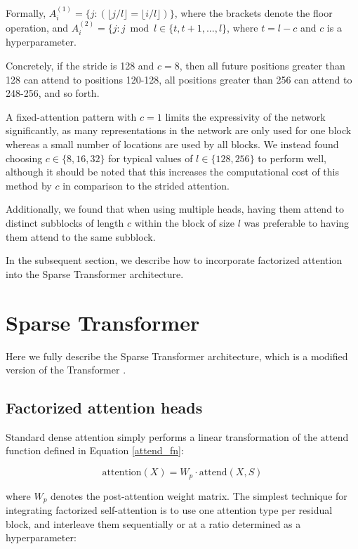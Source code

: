 \documentclass{article}
\begin{document}
Formally, $A_{i}^{(1)} = \{j : (\lfloor j / l \rfloor = \lfloor i / l \rfloor)\} $, where the brackets denote the floor operation, and $A_{i}^{(2)} = \{j : j \bmod l \in \{t, t + 1, ..., l \}$, where $t = l - c$ and $c$ is a hyperparameter. 

Concretely, if the stride is 128 and $c = 8$, then all future positions greater than 128 can attend to positions 120-128, all positions greater than 256 can attend to 248-256, and so forth.

A fixed-attention pattern with $c = 1$ limits the expressivity of the network significantly, as many representations in the network are only used for one block whereas a small number of locations are used by all blocks. We instead found choosing $c \in \{8, 16, 32\}$ for typical values of $l \in \{128, 256\}$ to perform well, although it should be noted that this increases the computational cost of this method by $c$ in comparison to the strided attention.

Additionally, we found that when using multiple heads, having them attend to distinct subblocks of length $c$ within the block of size $l$ was preferable to having them attend to the same subblock.

In the subsequent section, we describe how to incorporate factorized attention into the Sparse Transformer architecture.

\section{Sparse Transformer}
Here we fully describe the Sparse Transformer architecture, which is a modified version of the Transformer \cite{vaswani2017attention}.

\subsection{Factorized attention heads}
Standard dense attention simply performs a linear transformation of the $\mathrm{attend}$ function defined in Equation \ref{attend_fn}:

\begin{equation}\label{wpmat}
\mathrm{attention}(X) = W_p \cdot \mathrm{attend}(X, S)\end{equation}

where $W_p$ denotes the post-attention weight matrix. The simplest technique for integrating factorized self-attention is to use one attention type per residual block, and interleave them sequentially or at a ratio determined as a hyperparameter:
\end{document}
